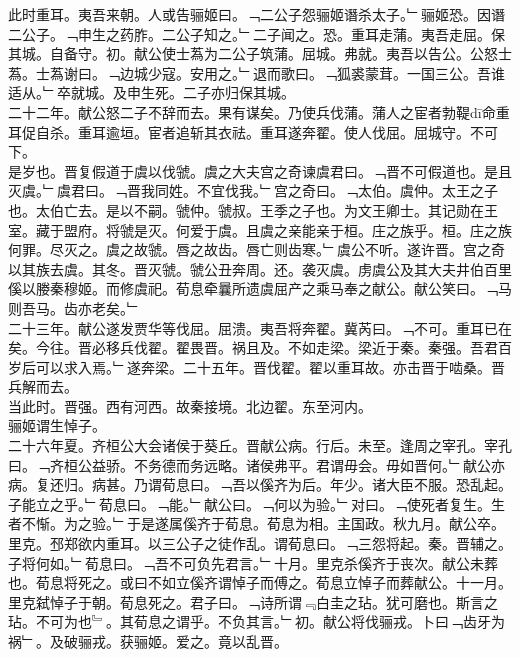 \documentclass{zhvt-classic}
\begin{document}
\hspace*{2em}此时重耳。夷吾来朝。人或告骊姬曰。﹁二公子怨骊姬谮杀太子。﹂骊姬恐。因谮二公子。﹁申生之药胙。二公子知之。﹂二子闻之。恐。重耳走蒲。夷吾走屈。保其城。自备守。初。献公使士蒍为二公子筑蒲。屈城。弗就。夷吾以告公。公怒士蒍。士蒍谢曰。﹁边城少寇。安用之。﹂退而歌曰。﹁狐裘蒙茸。一国三公。吾谁适从。﹂卒就城。及申生死。二子亦归保其城。\\
\hspace*{2em}二十二年。献公怒二子不辞而去。果有谋矣。乃使兵伐蒲。蒲人之宦者勃鞮dī命重耳促自杀。重耳逾垣。宦者追斩其衣祛。重耳遂奔翟。使人伐屈。屈城守。不可下。\\
\hspace*{2em}是岁也。晋复假道于虞以伐虢。虞之大夫宫之奇谏虞君曰。﹁晋不可假道也。是且灭虞。﹂虞君曰。﹁晋我同姓。不宜伐我。﹂宫之奇曰。﹁太伯。虞仲。太王之子也。太伯亡去。是以不嗣。虢仲。虢叔。王季之子也。为文王卿士。其记勋在王室。藏于盟府。将虢是灭。何爱于虞。且虞之亲能亲于桓。庄之族乎。桓。庄之族何罪。尽灭之。虞之故虢。唇之故齿。唇亡则齿寒。﹂虞公不听。遂许晋。宫之奇以其族去虞。其冬。晋灭虢。虢公丑奔周。还。袭灭虞。虏虞公及其大夫井伯百里傒以媵秦穆姬。而修虞祀。荀息牵曩所遗虞屈产之乘马奉之献公。献公笑曰。﹁马则吾马。齿亦老矣。﹂\\
\hspace*{2em}二十三年。献公遂发贾华等伐屈。屈溃。夷吾将奔翟。冀芮曰。﹁不可。重耳已在矣。今往。晋必移兵伐翟。翟畏晋。祸且及。不如走梁。梁近于秦。秦强。吾君百岁后可以求入焉。﹂遂奔梁。二十五年。晋伐翟。翟以重耳故。亦击晋于啮桑。晋兵解而去。\\
\hspace*{2em}当此时。晋强。西有河西。故秦接境。北边翟。东至河内。\\
\hspace*{2em}骊姬谓生悼子。\\
\hspace*{2em}二十六年夏。齐桓公大会诸侯于葵丘。晋献公病。行后。未至。逢周之宰孔。宰孔曰。﹁齐桓公益骄。不务德而务远略。诸侯弗平。君谓毋会。毋如晋何。﹂献公亦病。复还归。病甚。乃谓荀息曰。﹁吾以傒齐为后。年少。诸大臣不服。恐乱起。子能立之乎。﹂荀息曰。﹁能。﹂献公曰。﹁何以为验。﹂对曰。﹁使死者复生。生者不惭。为之验。﹂于是遂属傒齐于荀息。荀息为相。主国政。秋九月。献公卒。里克。邳郑欲内重耳。以三公子之徒作乱。谓荀息曰。﹁三怨将起。秦。晋辅之。子将何如。﹂荀息曰。﹁吾不可负先君言。﹂十月。里克杀傒齐于丧次。献公未葬也。荀息将死之。或曰不如立傒齐谓悼子而傅之。荀息立悼子而葬献公。十一月。里克弑悼子于朝。荀息死之。君子曰。﹁诗所谓﹃白圭之玷。犹可磨也。斯言之玷。不可为也﹄。其荀息之谓乎。不负其言。﹂初。献公将伐骊戎。卜曰﹁齿牙为祸﹂。及破骊戎。获骊姬。爱之。竟以乱晋。\\
\end{document}
